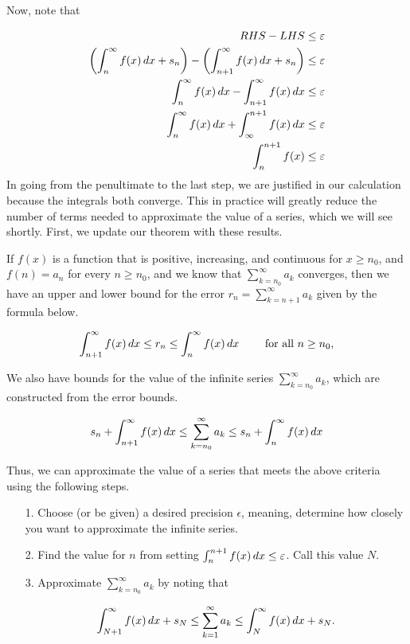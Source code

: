 \documentclass{ximera}
\begin{document}
Now, note that

\begin{align*}
RHS-LHS &\leq \varepsilon \\
\left( \int_{n}^\infty f(x) \mathop{}\!d x  +s_n\right) - \left( \int_{n+1}^\infty f(x) \mathop{}\!d x  +s_n \right) &\leq \varepsilon \\
 \int_{n}^\infty f(x) \mathop{}\!d x  - \int_{n+1}^\infty f(x) \mathop{}\!d x   &\leq \varepsilon \\
  \int_{n}^\infty f(x) \mathop{}\!d x  +  \int_{\infty}^{n+1} f(x) \mathop{}\!d x   &\leq \varepsilon \\
    \int_{n}^{n+1} f(x)  &\leq \varepsilon \\
\end{align*} 
In going from the penultimate to the last step, we are justified in our calculation because the integrals both converge.  This in practice will greatly reduce the number of terms needed to approximate the value of a series, which we will see shortly.  First, we update our theorem with these results.

\begin{theorem}
If $f(x)$ is a function that is positive, increasing, and continuous for $x \geq n_0$,  and $f(n) = a_n$ for every $n \geq n_0$, and we know that $\sum_{k=n_0}^\infty a_k$ converges, then we have an upper and lower bound for the error $r_n=\sum_{k=n+1}^{\infty} a_k$ given by the formula below.

\[
\int_{n+1}^{\infty} f(x) \mathop{}\!d x \leq  r_n \leq \int_{n}^{\infty} f(x) \mathop{}\!d x \qquad \textrm{ for all } n \geq n_0,
\]

We also have bounds for the value of the infinite series $\sum_{k=n_0}^\infty a_k$, which are constructed from the error bounds.

\[
s_n+ \int_{n+1}^{\infty} f(x) \mathop{}\!d x \leq  \sum_{k=n_0}^\infty a_k \leq s_n+ \int_{n}^{\infty} f(x) \mathop{}\!d x 
\]

\end{theorem}
Thus, we can approximate the value of a series that meets the above criteria using the following steps.

\begin{itemize}
\item[1.] Choose (or be given) a desired precision $\epsilon$, meaning, determine how closely you want to approximate the infinite series.
\item[2.] Find the value for $n$ from setting $\int_n^{n+1} f(x) \mathop{}\!d x \leq \varepsilon$.  Call this value $N$.
\item[3.] Approximate $\sum_{k=n_0}^{\infty} a_k$ by noting that 

\[
\int_{N+1}^\infty f(x) \mathop{}\!d x  +s_N \leq \sum_{k=1}^{\infty} a_k \leq \int_{N}^\infty f(x) \mathop{}\!d x  +s_N.
\]
\end{itemize}
\end{document}
